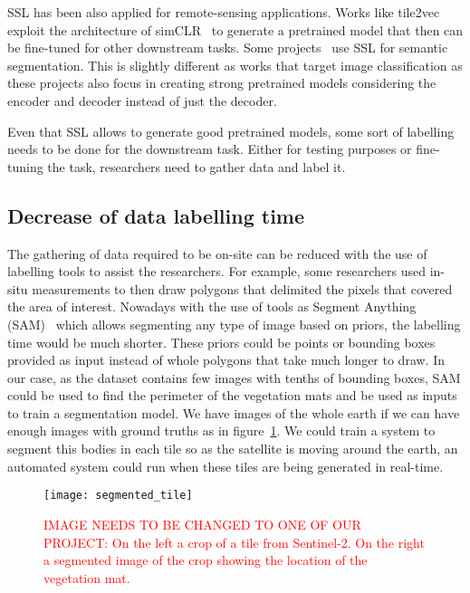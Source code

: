\documentclass[conference]{IEEEtran}
\begin{document}
    SSL has been also applied for remote-sensing applications.
    Works like tile2vec~\cite{jean2019tile2vec} exploit the architecture of simCLR~\cite{chen2020simple} to generate a pretrained model that
    then can be fine-tuned for other downstream tasks.
    Some projects~\cite{inproceedings, 9460820, Li_2022, akiva2020h2onet} use SSL for semantic segmentation.
    This is slightly different as works that target image classification as these projects also focus in creating strong pretrained models considering
    the encoder and decoder instead of just the decoder.

    Even that SSL allows to generate good pretrained models, some sort of labelling needs to be done for the downstream task.
    Either for testing purposes or fine-tuning the task, researchers need to gather data and label it.

    \subsection*{Decrease of data labelling time}

    The gathering of data required to be on-site can be reduced with the use of labelling tools to assist the researchers.
    For example, some researchers used in-situ measurements to then draw polygons that delimited the pixels that covered the area of interest.
    Nowadays with the use of tools as Segment Anything (SAM)~\cite{kirillov2023segment} which allows segmenting any type of image based on priors, the labelling time would be much shorter.
    These priors could be points or bounding boxes provided as input instead of whole polygons that take much longer to draw.
    In our case, as the dataset contains few images with tenths of bounding boxes, SAM could be used to find the perimeter
    of the vegetation mats and be used as inputs to train a segmentation model.
    We have images of the whole earth if we can have enough images with ground truths as in figure~\ref{fig:tile-segmented}.
    We could train a system to segment this bodies in each tile so as the satellite is moving around the earth, an automated system could run when these tiles are being generated in real-time.

    \begin{figure}[h]
        \centering
        \texttt{[image: segmented\_tile]}
        \caption{\textcolor{red}{IMAGE NEEDS TO BE CHANGED TO ONE OF OUR PROJECT:
        On the left a crop of a tile from Sentinel-2. On the right a segmented image of the crop showing the
        location of the vegetation mat.}}
        \label{fig:tile-segmented}
    \end{figure}
\end{document}
